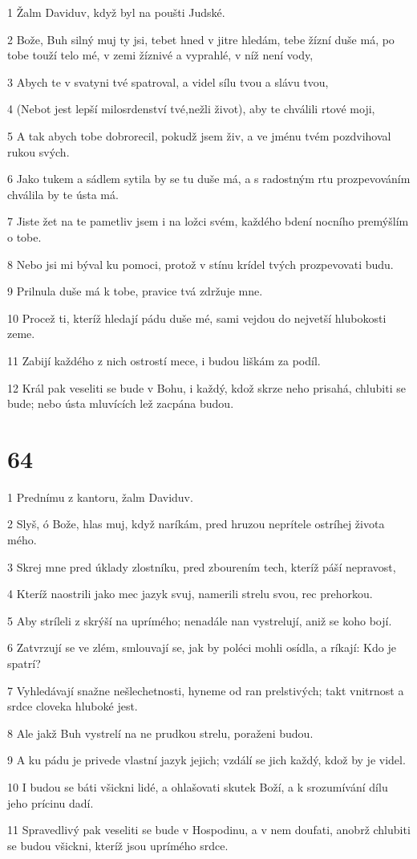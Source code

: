 \par 1 Žalm Daviduv, když byl na poušti Judské.
\par 2 Bože, Buh silný muj ty jsi, tebet hned v jitre hledám, tebe žízní duše má, po tobe touží telo mé, v zemi žíznivé a vyprahlé, v níž není vody,
\par 3 Abych te v svatyni tvé spatroval, a videl sílu tvou a slávu tvou,
\par 4 (Nebot jest lepší milosrdenství tvé,nežli život), aby te chválili rtové moji,
\par 5 A tak abych tobe dobrorecil, pokudž jsem živ, a ve jménu tvém pozdvihoval rukou svých.
\par 6 Jako tukem a sádlem sytila by se tu duše má, a s radostným rtu prozpevováním chválila by te ústa má.
\par 7 Jiste žet na te pametliv jsem i na ložci svém, každého bdení nocního premýšlím o tobe.
\par 8 Nebo jsi mi býval ku pomoci, protož v stínu krídel tvých prozpevovati budu.
\par 9 Prilnula duše má k tobe, pravice tvá zdržuje mne.
\par 10 Procež ti, kteríž hledají pádu duše mé, sami vejdou do nejvetší hlubokosti zeme.
\par 11 Zabijí každého z nich ostrostí mece, i budou liškám za podíl.
\par 12 Král pak veseliti se bude v Bohu, i každý, kdož skrze neho prisahá, chlubiti se bude; nebo ústa mluvících lež zacpána budou.

\chapter{64}

\par 1 Prednímu z kantoru, žalm Daviduv.
\par 2 Slyš, ó Bože, hlas muj, když naríkám, pred hruzou neprítele ostríhej života mého.
\par 3 Skrej mne pred úklady zlostníku, pred zbourením tech, kteríž páší nepravost,
\par 4 Kteríž naostrili jako mec jazyk svuj, namerili strelu svou, rec prehorkou.
\par 5 Aby stríleli z skrýší na uprímého; nenadále nan vystrelují, aniž se koho bojí.
\par 6 Zatvrzují se ve zlém, smlouvají se, jak by poléci mohli osídla, a ríkají: Kdo je spatrí?
\par 7 Vyhledávají snažne nešlechetnosti, hyneme od ran prelstivých; takt vnitrnost a srdce cloveka hluboké jest.
\par 8 Ale jakž Buh vystrelí na ne prudkou strelu, poraženi budou.
\par 9 A ku pádu je privede vlastní jazyk jejich; vzdálí se jich každý, kdož by je videl.
\par 10 I budou se báti všickni lidé, a ohlašovati skutek Boží, a k srozumívání dílu jeho prícinu dadí.
\par 11 Spravedlivý pak veseliti se bude v Hospodinu, a v nem doufati, anobrž chlubiti se budou všickni, kteríž jsou uprímého srdce.

